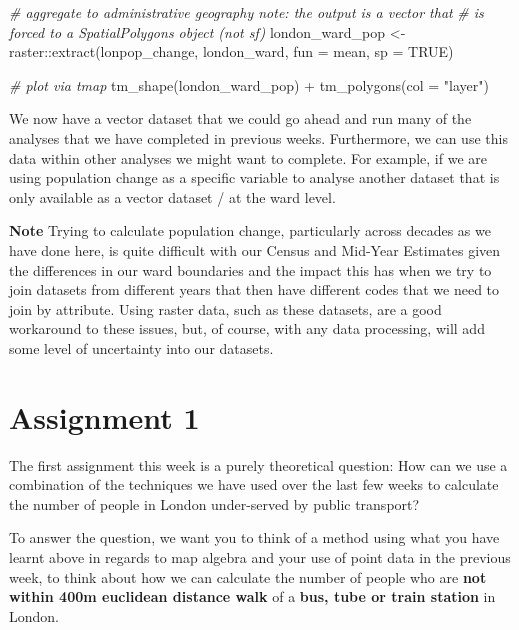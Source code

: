 \documentclass[
]{book}
\newenvironment{Shaded}{\begin{snugshade}}{\end{snugshade}}
\newcommand{\AttributeTok}[1]{\textcolor[rgb]{0.77,0.63,0.00}{#1}}
\newcommand{\CommentTok}[1]{\textcolor[rgb]{0.56,0.35,0.01}{\textit{#1}}}
\newcommand{\ConstantTok}[1]{\textcolor[rgb]{0.00,0.00,0.00}{#1}}
\newcommand{\FunctionTok}[1]{\textcolor[rgb]{0.00,0.00,0.00}{#1}}
\newcommand{\NormalTok}[1]{#1}
\newcommand{\OtherTok}[1]{\textcolor[rgb]{0.56,0.35,0.01}{#1}}
\newcommand{\SpecialCharTok}[1]{\textcolor[rgb]{0.00,0.00,0.00}{#1}}
\newcommand{\StringTok}[1]{\textcolor[rgb]{0.31,0.60,0.02}{#1}}
\begin{document}
\begin{Shaded}
\begin{Highlighting}[]
\CommentTok{\# aggregate to administrative geography note: the output is a vector that}
\CommentTok{\# is forced to a SpatialPolygons object (not sf)}
\NormalTok{london\_ward\_pop }\OtherTok{\textless{}{-}}\NormalTok{ raster}\SpecialCharTok{::}\FunctionTok{extract}\NormalTok{(lonpop\_change, london\_ward, }\AttributeTok{fun =}\NormalTok{ mean, }\AttributeTok{sp =} \ConstantTok{TRUE}\NormalTok{)}

\CommentTok{\# plot via tmap}
\FunctionTok{tm\_shape}\NormalTok{(london\_ward\_pop) }\SpecialCharTok{+} \FunctionTok{tm\_polygons}\NormalTok{(}\AttributeTok{col =} \StringTok{"layer"}\NormalTok{)}
\end{Highlighting}
\end{Shaded}

We now have a vector dataset that we could go ahead and run many of the analyses that we have completed in previous weeks. Furthermore, we can use this data within other analyses we might want to complete. For example, if we are using population change as a specific variable to analyse another dataset that is only available as a vector dataset / at the ward level.

\textbf{Note}
Trying to calculate population change, particularly across decades as we have done here, is quite difficult with our Census and Mid-Year Estimates given the differences in our ward boundaries and the impact this has when we try to join datasets from different years that then have different codes that we need to join by attribute. Using raster data, such as these datasets, are a good workaround to these issues, but, of course, with any data processing, will add some level of uncertainty into our datasets.

\hypertarget{assignment-w09-01}{%
\section{Assignment 1}\label{assignment-w09-01}}

The first assignment this week is a purely theoretical question: How can we use a combination of the techniques we have used over the last few weeks to calculate the number of people in London under-served by public transport?

To answer the question, we want you to think of a method using what you have learnt above in regards to map algebra and your use of point data in the previous week, to think about how we can calculate the number of people who are \textbf{not within 400m euclidean distance walk} of a \textbf{bus, tube or train station} in London.
\end{document}

